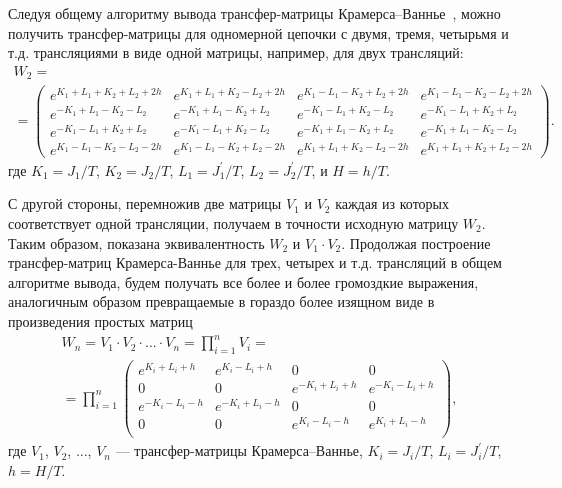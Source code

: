 Следуя общему алгоритму вывода трансфер-матрицы Крамерса--Ваннье~\cite{kramers_wannier1}, можно получить трансфер-матрицы для одномерной цепочки с двумя, тремя, четырьмя и т.д. трансляциями в виде одной матрицы, например, для двух трансляций:
\begin{multline}
W_2=\\=
\begin{pmatrix}
e^{K_{1}+L_{1}+K_{2}+L_{2}+2h}\!\! &\! e^{K_{1}+L_{1}+K_{2}-L_{2}+2h}&\!\! e^{K_{1}-L_{1}-K_{2}+L_{2}+2h}\!\! &\! e^{K_{1}-L_{1}-K_{2}-L_{2}+2h}\\
e^{-K_{1}+L_{1}-K_{2}-L_{2}}\!\! &\! e^{-K_{1}+L_{1}-K_{2}+L_{2}}& \!\! e^{-K_{1}-L_{1}+K_{2}-L_{2}}\!\! &\! e^{-K_{1}-L_{1}+K_{2}+L_{2}}\\
e^{-K_{1}-L_{1}+K_{2}+L_{2}}\!\! &\!  e^{-K_{1}-L_{1}+K_{2}-L_{2}}&\!\! e^{-K_{1}+L_{1}-K_{2}+L_{2}}\!\!  &\!  e^{-K_{1}+L_{1}-K_{2}-L_{2}}\\
e^{K_{1}-L_{1}-K_{2}-L_{2}-2h}\!\! & \!  e^{K_{1}-L_{1}-K_{2}+L_{2}-2h}&\!\! e^{K_{1}+L_{1}+K_{2}-L_{2}-2h}\!\!  &\!   e^{K_{1}+L_{1}+K_{2}+L_{2}-2h}
\label{11}
\end{pmatrix}.
\end{multline}
где $K_1=J_1/T$, $K_2=J_2/T$, $L_1=J^{'}_1/T$, $L_2=J^{'}_2/T$, и $H=h/T$.

С другой стороны, перемножив две матрицы $V_1$ и $V_2$ каждая из которых соответствует одной трансляции, получаем в точности исходную матрицу $W_2$. Таким образом, показана эквивалентность $W_2$ и $V_1\cdot V_2$. Продолжая построение трансфер-матриц Крамерса-Ваннье для трех, четырех и т.д. трансляций в общем алгоритме вывода, будем получать все более и более громоздкие выражения, аналогичным образом превращаемые в гораздо более изящном виде в произведения простых матриц
\begin{multline}
W_n = V_1\cdot V_2 \cdot... \cdot V_n = \prod_{i=1}^n V_i =\\= \prod_{i=1}^n  \begin{pmatrix}
e^{K_{i}+L_{i}+h}\!\! &\! e^{K_{i}-L_{i}+h}&\!\! 0\!\! &\! 0\\
0\!\! &\! 0& \!\! e^{-K_{i}+L_{i}+h}\!\! &\! e^{-K_{i}-L_{i}+h}\\
e^{-K_{i}-L_{i}-h}\!\! &\!  e^{-K_{i}+L_{i}-h}&\!\! 0\!\!  &\!  0\\
0\!\! & \!  0&\!\! e^{K_{i}-L_{i}-h}\!\!  &\!   e^{K_{i}+L_{i}-h}\\
\end{pmatrix},
\label{2}
\end{multline}
где $V_1$, $V_2$, $\dots$, $V_n$ --- трансфер-матрицы Крамерса--Ваннье, \mbox{$K_i = J_i/T$}, \mbox{$L_i = J_i^{'}/T$}, $h=H/T$.

